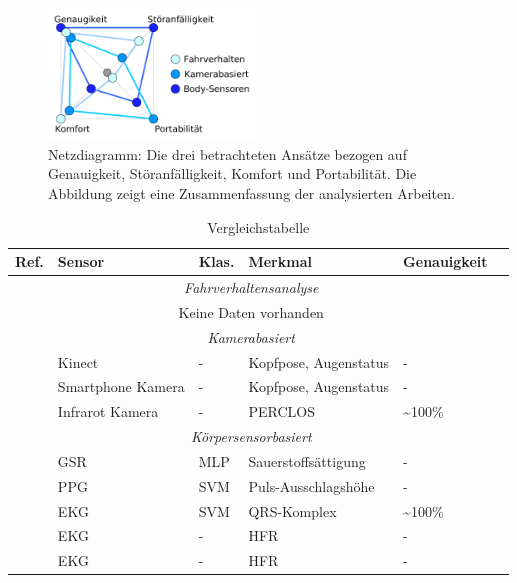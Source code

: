{\begin{figure}[h] 
  \begin{center}
    \includegraphics[width=5.5cm]{img/analysis}
    \caption{ Netzdiagramm: Die drei betrachteten Ansätze bezogen auf Genauigkeit, Störanfälligkeit, Komfort und Portabilität. Die Abbildung zeigt eine Zusammenfassung der analysierten Arbeiten.}
    \label{fig:analysis}
  \end{center}
\end{figure}


\begin{table}[t]
 \caption{Vergleichstabelle}
 \begin{tabular}{clllll}
  \hline
	\textbf{Ref.} & \textbf{Sensor} & \textbf{Klas.} & \textbf{Merkmal} &  \textbf{Genauigkeit} \\
	 \hline
	 \multicolumn{5}{c}{\textit{Fahrverhaltensanalyse}} \\
	 \multicolumn{5}{c}{Keine Daten vorhanden} \\
	 \hline

	 \multicolumn{5}{c}{\textit{Kamerabasiert}} \\
	 \cite{Zhang:2015:RSD:2753829.2629482} & Kinect & - & Kopfpose, Augenstatus & - \\
	 \cite{You:2013:CAA:2462456.2465428} & Smartphone Kamera & - & Kopfpose, Augenstatus & - \\
	 \cite{Bergasa_1603553} & Infrarot Kamera & - & PERCLOS & \textasciitilde 100\% \\
	 \hline

	 \multicolumn{5}{c}{\textit{Körpersensorbasiert}} \\
	 \citep{Bundele:2009:DFV:1806338.1806478} & GSR & MLP & Sauerstoffsättigung & -\\
	 \cite{Park:2009:DDD:1667780.1667798} & PPG & SVM & Puls-Ausschlagshöhe & -\\
	 \cite{zhang_6513058} & EKG & SVM & QRS-Komplex & \textasciitilde 100\% \\
	 \cite{Rogado_4913155} & EKG & - & HFR & - \\
	 \cite{Vicente_6164509} & EKG & - & HFR & - \\


\end{tabular}
\end{table}}
